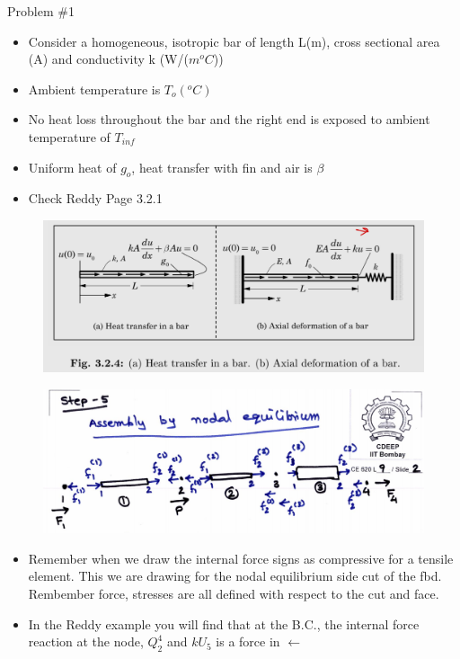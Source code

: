 	\begin{frame}{Problem \#1}
		\begin{itemize}
			\item Consider a homogeneous, isotropic bar of length L(m), cross sectional area (A) and conductivity k (W/($m^oC$))
			\item  Ambient temperature is $T_o(^oC)$
			\item No heat loss throughout the bar and the right end is exposed to ambient temperature of $T_{inf }$
			\item Uniform heat of $g_o$, heat transfer with fin and air is $\beta$
			\item Check Reddy Page 3.2.1
		\end{itemize}
		\begin{figure}
			\centering
			\includegraphics[width=0.7\linewidth]{Figure/fig6} 
		\end{figure} 
	\end{frame}


	\begin{frame}
		\begin{figure}
			\centering
			\includegraphics[width=0.7\linewidth]{Figure/fig8} 
		\end{figure} 
		\begin{itemize}
			\item Remember when we draw the internal force signs as compressive for a tensile element. This we are drawing for the nodal equilibrium side cut of the fbd. Rembember force, stresses are all defined with respect to the cut and face. 
			\item In the Reddy example you will find that at the B.C., the internal force reaction at the node, $Q^4_2$ and $kU_5$ is a force in $\leftarrow$
		\end{itemize}
	\end{frame}



